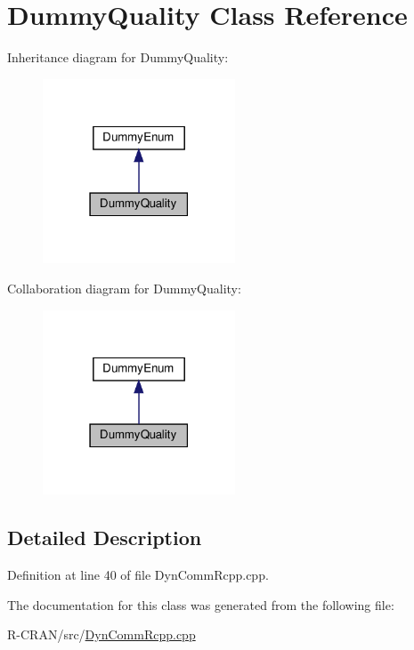 \hypertarget{classDummyQuality}{}\section{Dummy\+Quality Class Reference}
\label{classDummyQuality}


Inheritance diagram for Dummy\+Quality\+:\nopagebreak
\begin{figure}[H]
\begin{center}
\leavevmode
\includegraphics[width=162pt]{classDummyQuality__inherit__graph}
\end{center}
\end{figure}


Collaboration diagram for Dummy\+Quality\+:\nopagebreak
\begin{figure}[H]
\begin{center}
\leavevmode
\includegraphics[width=162pt]{classDummyQuality__coll__graph}
\end{center}
\end{figure}


\subsection{Detailed Description}


Definition at line 40 of file Dyn\+Comm\+Rcpp.\+cpp.



The documentation for this class was generated from the following file\+:\begin{DoxyCompactItemize}
\item 
R-\/\+C\+R\+A\+N/src/\hyperlink{DynCommRcpp_8cpp}{Dyn\+Comm\+Rcpp.\+cpp}\end{DoxyCompactItemize}
